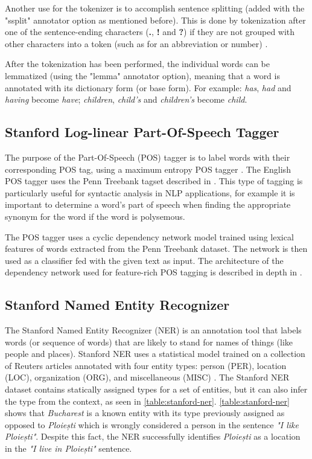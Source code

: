 Another use for the tokenizer is to accomplish sentence splitting (added with the "ssplit" annotator option as mentioned before). This is done by tokenization after one of the sentence-ending characters (\textbf{.}, \textbf{!} and \textbf{?}) if they are not grouped with other characters into a token (such as for an abbreviation or number) \cite{StanfordTokenizer}.

After the tokenization has been performed, the individual words can be lemmatized (using the "lemma" annotator option), meaning that a word is annotated with its dictionary form (or base form). For example: {\em has}, {\em had} and {\em having} become {\em have}; {\em children}, {\em child's} and {\em children's} become {\em child}.

\subsection{Stanford Log-linear Part-Of-Speech Tagger}
\label{sub-sec:stanford-pos}

The purpose of the Part-Of-Speech (POS) tagger is to label words with their corresponding POS tag, using a maximum entropy POS tagger \cite{Manning2014}. The English POS tagger uses the Penn Treebank tagset described in \cite{Marcus1993}. This type of tagging is particularly useful for syntactic analysis in NLP applications, for example it is important to determine a word's part of speech when finding the appropriate synonym for the word if the word is polysemous.

The POS tagger uses a cyclic dependency network model trained using lexical features of words extracted from the Penn Treebank dataset. The network is then used as a classifier fed with the given text as input. The architecture of the dependency network used for feature-rich POS tagging is described in depth in \cite{Toutanova2003}.

\subsection{Stanford Named Entity Recognizer}
\label{sub-sec:stanford-ner}

The Stanford Named Entity Recognizer (NER) is an annotation tool that labels words (or sequence of words) that are likely to stand for names of things (like people and places). Stanford NER uses a statistical model trained on a collection of Reuters articles annotated with four entity types: person (PER), location (LOC), organization (ORG), and miscellaneous (MISC) \cite{Finkel2005}. The Stanford NER dataset contains statically assigned types for a set of entities, but it can also infer the type from the context, as seen in \autoref{table:stanford-ner}. \autoref{table:stanford-ner} shows that {\em Bucharest} is a known entity with its type previously assigned as opposed to {\em Ploiești} which is wrongly considered a person in the sentence {\em "I like Ploiești"}. Despite this fact, the NER successfully identifies {\em Ploiești} as a location in the {\em "I live in Ploiești"} sentence.

